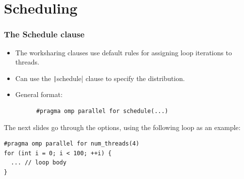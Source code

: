 \documentclass[aspectratio=169]{beamer}
\begin{document}
\section{Scheduling}
\begin{frame}[fragile]
\frametitle{The Schedule clause}
\begin{itemize}
  \item The worksharing clauses use default rules for assigning loop iterations to threads.
  \item Can use the \texttt|schedule| clause to specify the distribution.
  \item General format:
    \begin{verbatim}
      #pragma omp parallel for schedule(...)
    \end{verbatim}
\end{itemize}
The next slides go through the options, using the following loop as an example:
\begin{verbatim}
#pragma omp parallel for num_threads(4)
for (int i = 0; i < 100; ++i) {
  ... // loop body
}
\end{verbatim}

\end{frame}
\end{document}

